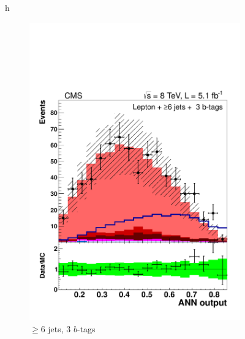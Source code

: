 \begin{figure}{h}
\begin{subfigure}[h]{0.31\textwidth}
        \includegraphics[width=\textwidth]{Figures/Analysis_1_Diagrams/d2MCPlots_CFMlpANN_cut6_jge6_t3_Combined_HtWgt.pdf}
        \caption{$\ge$6 jets, 3 $b$-tags}\label{lj_ANNoutput_8TeV_4}
      \end{subfigure}
      ~ %
      \begin{subfigure}[h]{0.31\textwidth}

\end{subfigure}
\end{figure}
